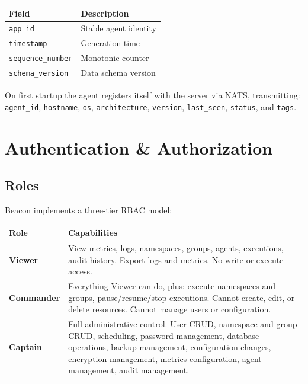 \documentclass[12pt,a4paper]{article}
\begin{document}
\begin{center}
\begin{tabular}{ll}
\toprule
Field & Description \\
\midrule
\texttt{app\_id} & Stable agent identity \\
\texttt{timestamp} & Generation time \\
\texttt{sequence\_number} & Monotonic counter \\
\texttt{schema\_version} & Data schema version \\
\bottomrule
\end{tabular}
\end{center}

On first startup the agent registers itself with the server via NATS, transmitting: \texttt{agent\_id}, \texttt{hostname}, \texttt{os}, \texttt{architecture}, \texttt{version}, \texttt{last\_seen}, \texttt{status}, and \texttt{tags}.

\section{Authentication \& Authorization}

\subsection{Roles}

Beacon implements a three-tier RBAC model:

\begin{center}
\begin{tabularx}{\textwidth}{lX}
\toprule
Role & Capabilities \\
\midrule
\textbf{Viewer} &
  View metrics, logs, namespaces, groups, agents, executions, audit history.
  Export logs and metrics. No write or execute access. \\[0.5em]
\textbf{Commander} &
  Everything Viewer can do, plus: execute namespaces and groups, pause/resume/stop
  executions. Cannot create, edit, or delete resources. Cannot manage users or
  configuration. \\[0.5em]
\textbf{Captain} &
  Full administrative control. User CRUD, namespace and group CRUD, scheduling,
  password management, database operations, backup management, configuration changes,
  encryption management, metrics configuration, agent management, audit management. \\
\bottomrule
\end{tabularx}
\end{center}
\end{document}
